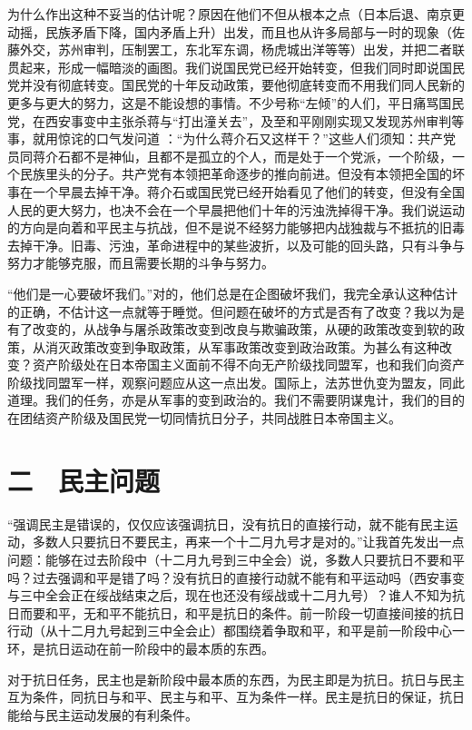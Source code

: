 为什么作出这种不妥当的估计呢？原因在他们不但从根本之点（日本后退、南京更动摇，民族矛盾下降，国内矛盾上升）出发，而且也从许多局部与一时的现象（佐藤外交，苏州审判，压制罢工，东北军东调，杨虎城出洋等等）出发，并把二者联贯起来，形成一幅暗淡的画图。我们说国民党已经开始转变，但我们同时即说国民党并没有彻底转变。国民党的十年反动政策，要他彻底转变而不用我们同人民新的更多与更大的努力，这是不能设想的事情。不少号称“左倾”的人们，平日痛骂国民党，在西安事变中主张杀蒋与“打出潼关去”，及至和平刚刚实现又发现苏州审判等事，就用惊诧的口气发问道
：“为什么蒋介石又这样干？”这些人们须知：共产党员同蒋介石都不是神仙，且都不是孤立的个人，而是处于一个党派，一个阶级，一个民族里头的分子。共产党有本领把革命逐步的推向前进。但没有本领把全国的坏事在一个早晨去掉干净。蒋介石或国民党已经开始看见了他们的转变，但没有全国人民的更大努力，也决不会在一个早晨把他们十年的污浊洗掉得干净。我们说运动的方向是向着和平民主与抗战，但不是说不经努力能够把内战独裁与不抵抗的旧毒去掉干净。旧毒、污浊，革命进程中的某些波折，以及可能的回头路，只有斗争与努力才能够克服，而且需要长期的斗争与努力。

“他们是一心要破坏我们。”对的，他们总是在企图破坏我们，我完全承认这种估计的正确，不估计这一点就等于睡觉。但问题在破坏的方式是否有了改变？我以为是有了改变的，从战争与屠杀政策改变到改良与欺骗政策，从硬的政策改变到软的政策，从消灭政策改变到争取政策，从军事政策改变到政治政策。为甚么有这种改变？资产阶级处在日本帝国主义面前不得不向无产阶级找同盟军，也和我们向资产阶级找同盟军一样，观察问题应从这一点出发。国际上，法苏世仇变为盟友，同此道理。我们的任务，亦是从军事的变到政治的。我们不需要阴谋鬼计，我们的目的在团结资产阶级及国民党一切同情抗日分子，共同战胜日本帝国主义。

\section{二　民主问题}

“强调民主是错误的，仅仅应该强调抗日，没有抗日的直接行动，就不能有民主运动，多数人只要抗日不要民主，再来一个十二月九号才是对的。”让我首先发出一点问题：能够在过去阶段中（十二月九号到三中全会）说，多数人只要抗日不要和平吗？过去强调和平是错了吗？没有抗日的直接行动就不能有和平运动吗（西安事变与三中全会正在绥战结束之后，现在也还没有绥战或十二月九号）？谁人不知为抗日而要和平，无和平不能抗日，和平是抗日的条件。前一阶段一切直接间接的抗日行动（从十二月九号起到三中全会止）都围绕着争取和平，和平是前一阶段中心一环，是抗日运动在前一阶段中的最本质的东西。

对于抗日任务，民主也是新阶段中最本质的东西，为民主即是为抗日。抗日与民主互为条件，同抗日与和平、民主与和平、互为条件一样。民主是抗日的保证，抗日能给与民主运动发展的有利条件。

